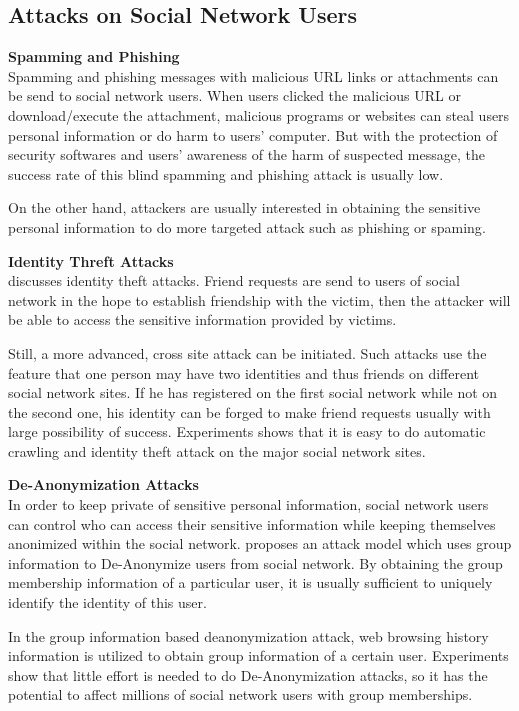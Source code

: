 \documentclass[12pt]{article}
\begin{document}
\subsection{Attacks on Social Network Users}
\textbf{Spamming and Phishing\cite{spamming-phishing-privacy}} \\
Spamming and phishing messages with malicious URL links or attachments
can be send to social network users. When users clicked the malicious
URL or download/execute the attachment, malicious programs or websites
can steal users personal information or do harm to users'
computer. But with the protection of security softwares and users'
awareness of the harm of suspected message, the success rate of this
blind spamming and phishing attack is usually low.

On the other hand, attackers are usually interested in obtaining the
sensitive personal information to do more targeted attack such as
phishing or spaming\cite{context-aware-spam}. 

\textbf{Identity Threft Attacks}\\
\cite{identity-theft-attack} discusses identity theft attacks. Friend
requests are send to users of social network in the hope to establish
friendship with the victim, then the attacker will be able to access
the sensitive information provided by victims.

Still, a more advanced, cross site attack can be initiated. Such
attacks use the feature that one person may have two identities and
thus friends on different social network sites. If he has registered
on the first social network while not on the second one, his identity
can be forged to make friend requests usually with large possibility
of success. Experiments shows that it is easy to do automatic crawling
and identity theft attack on the major social network sites.

\textbf{De-Anonymization Attacks}\\
In order to keep private of sensitive personal information, social
network users can control who can access their sensitive information
while keeping themselves anonimized within the social
network. \cite{group-deanonymize-attack} proposes an attack model which
uses group information to De-Anonymize users from social network. By
obtaining the group membership information of a particular user, it is
usually sufficient to uniquely identify the identity of this user.

In the group information based deanonymization attack, web browsing
history information is utilized to obtain group information of a
certain user. Experiments show that little effort is needed to do
De-Anonymization attacks, so it has the potential to affect millions
of social network users with group memberships.
\end{document}
